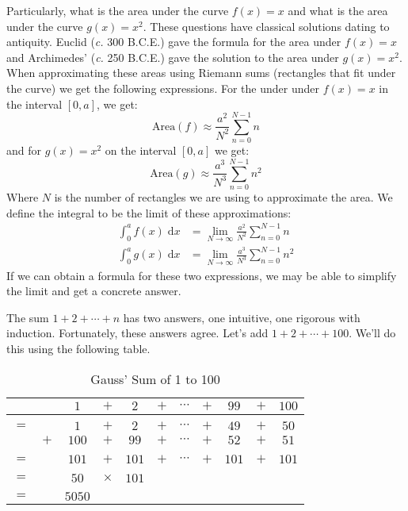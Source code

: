 \documentclass{article}
\theoremstyle{normal}
\theoremstyle{plain}
\begin{document}
    Particularly, what is the area under the curve $f(x)=x$ and what is the
    area under the curve $g(x)=x^{2}$. These questions have classical solutions
    dating to antiquity. Euclid (\textit{c.} 300 B.C.E.) gave the formula for
    the area under $f(x)=x$ and Archimedes' (\textit{c.} 250 B.C.E.) gave the
    solution to the area under $g(x)=x^{2}$. When approximating these areas
    using Riemann sums (rectangles that fit under the curve) we get the
    following expressions. For the under under $f(x)=x$ in the interval
    $[0,a]$, we get:
    \begin{equation}
        \textrm{Area}(f)\approx\frac{a^{2}}{N^{2}}
            \sum_{n=0}^{N-1}n
    \end{equation}
    and for $g(x)=x^{2}$ on the interval $[0,a]$ we get:
    \begin{equation}
        \textrm{Area}(g)\approx\frac{a^{3}}{N^{3}}
            \sum_{n=0}^{N-1}n^{2}
    \end{equation}
    Where $N$ is the number of rectangles we are using to approximate the area.
    We define the integral to be the limit of these approximations:
    \begin{align}
        \int_{0}^{a}f(x)\;\textrm{d}x
            &=\lim_{N\rightarrow\infty}\frac{a^{2}}{N^{2}}\sum_{n=0}^{N-1}n\\
            \int_{0}^{a}g(x)\;\textrm{d}x
                &=\lim_{N\rightarrow\infty}
                \frac{a^{3}}{N^{3}}\sum_{n=0}^{N-1}n^{2}
    \end{align}
    If we can obtain a formula for these two expressions, we may be able to
    simplify the limit and get a concrete answer.
    \par\hfill\par
    The sum $1+2+\cdots+n$ has two answers, one intuitive, one rigorous with
    induction. Fortunately, these answers agree. Let's add
    $1+2+\cdots+100$. We'll do this using the following table.
    \begin{table}[H]
        \centering
        \begin{tabular}{ccccccccccc}
            &&$1$&$+$&$2$&$+$&$\cdots$&$+$&$99$&$+$&$100$\\
            \hline\\
            $=$&&$1$&$+$&$2$&$+$&$\cdots$&$+$&$49$&$+$&$50$\\
            &$+$&$100$&$+$&$99$&$+$&$\cdots$&$+$&$52$&$+$&$51$\\
            \hline\\
            $=$&&$101$&$+$&$101$&$+$&$\cdots$&$+$&$101$&$+$&$101$\\
            \hline\\
            $=$&&$50$&$\times$&$101$\\
            \hline\\
            $=$&&$5050$
        \end{tabular}
        \caption{Gauss' Sum of 1 to 100}
    \end{table}
\end{document}
